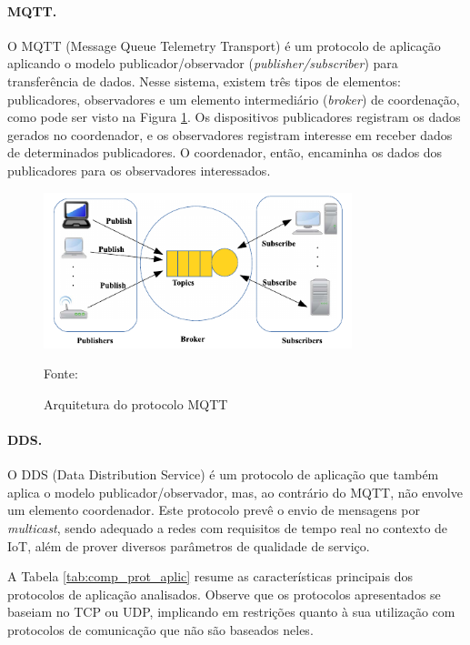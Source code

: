 \paragraph*{MQTT.} O MQTT (Message Queue Telemetry Transport) \cite{mqtt} é um protocolo de aplicação aplicando o modelo publicador/observador (\textit{publisher/subscriber}) para transferência de dados. Nesse sistema, existem três tipos de elementos: publicadores, observadores e um elemento intermediário (\textit{broker}) de coordenação, como pode ser visto na Figura \ref{fig:mqtt}. Os dispositivos publicadores registram os dados gerados no coordenador, e os observadores registram interesse em receber dados de determinados publicadores. O coordenador, então, encaminha os dados dos publicadores para os observadores interessados. 

\begin{figure}[h]
	\centering
	\caption{Arquitetura do protocolo MQTT}
  \includegraphics[width=0.8\textwidth]{imagens/mqtt.png}
  \label{fig:mqtt}  
  
  Fonte: \cite{Fuqaha2015}
\end{figure}

\paragraph*{DDS.} O DDS (Data Distribution Service) \cite{dds} é um protocolo de aplicação que também aplica o modelo publicador/observador, mas, ao contrário do MQTT, não envolve um elemento coordenador. Este protocolo prevê o envio de mensagens por \textit{multicast}, sendo adequado a redes com requisitos de tempo real no contexto de IoT, além de prover diversos parâmetros de qualidade de serviço.

A Tabela \ref{tab:comp_prot_aplic} resume as características principais dos protocolos de aplicação analisados. Observe que os protocolos apresentados se baseiam no TCP ou UDP, implicando em restrições quanto à sua utilização com protocolos de comunicação que não são baseados neles. 

